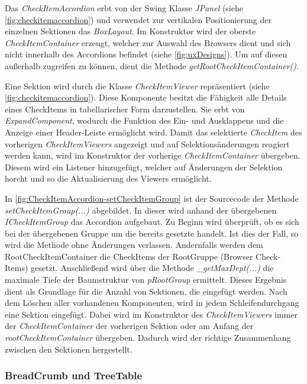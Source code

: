 Das \emph{CheckItemAccordion} erbt von der Swing Klasse \emph{JPanel} (siehe \autoref{fig:checkitemaccordion}) und verwendet zur vertikalen Positionierung der einzelnen Sektionen das \emph{BoxLayout}. Im Konstruktor wird der oberste \emph{CheckItemContainer} erzeugt, welcher zur Auswahl des Browsers dient und sich nicht innerhalb des Accordions befindet (siehe \autoref{fig:uxDesigns}). Um auf diesen außerhalb zugreifen zu können, dient die Methode \emph{getRootCheckItemContainer()}.

Eine Sektion wird durch die Klasse \emph{CheckItemViewer} repräsentiert (siehe \autoref{fig:checkitemaccordion}). Diese Komponente besitzt die Fähigkeit alle Details eines CheckItems in tabellarischer Form darzustellen. Sie erbt von \emph{ExpandComponent}, wodurch die Funktion des Ein- und Ausklappens und die Anzeige einer Header-Leiste ermöglicht wird. Damit das selektierte \emph{CheckItem} des vorherigen \emph{CheckItemViewers} angezeigt und auf Selektionsänderungen reagiert werden kann, wird im Konstruktor der vorherige \emph{CheckItemContainer} übergeben. Diesem wird ein Listener hinzugefügt, welcher auf Änderungen der Selektion horcht und so die Aktualisierung des Viewers ermöglicht.



In \autoref{fig:CheckItemAccordion-setCheckItemGroup} ist der Sourcecode der Methode \emph{setCheckItemGroup(...)} abgebildet. In dieser wird anhand der übergebenen \emph{ICheckItemGroup} das Accordion aufgebaut. Zu Beginn wird überprüft, ob es sich bei der übergebenen Gruppe um die bereits gesetzte handelt. Ist dies der Fall, so wird die Methode ohne Änderungen verlassen. Andernfalls werden dem RootCheckItemContainer die CheckItems der RootGruppe (Browser Check-Items) gesetzt. Anschließend wird über die Methode \emph{\_getMaxDept(...)} die maximale Tiefe der Baumstruktur von \emph{pRootGroup} ermittelt. Dieses Ergebnis dient als Grundlage für die Anzahl von Sektionen, die eingefügt werden. Nach dem Löschen aller vorhandenen Komponenten, wird in jedem Schleifendurchgang eine Sektion eingefügt. Dabei wird im Konstruktor des \emph{CheckItemViewers} immer der \emph{CheckItemContainer} der vorherigen Sektion oder am Anfang der \emph{rootCheckItemContainer} übergeben. Dadurch wird der richtige Zusammenhang zwischen den Sektionen hergestellt.

\subsubsection{BreadCrumb und TreeTable}

